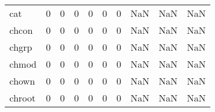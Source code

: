 \begin{longtable}{lrrrrrrrrr}
cat       &                                       0 &                                                  0 &                                                  0 &                                                  0 &                                                  0 &                                                  0 &                                                NaN &                                    NaN &                                  NaN \\
chcon     &                                       0 &                                                  0 &                                                  0 &                                                  0 &                                                  0 &                                                  0 &                                                NaN &                                    NaN &                                  NaN \\
chgrp     &                                       0 &                                                  0 &                                                  0 &                                                  0 &                                                  0 &                                                  0 &                                                NaN &                                    NaN &                                  NaN \\
chmod     &                                       0 &                                                  0 &                                                  0 &                                                  0 &                                                  0 &                                                  0 &                                                NaN &                                    NaN &                                  NaN \\
chown     &                                       0 &                                                  0 &                                                  0 &                                                  0 &                                                  0 &                                                  0 &                                                NaN &                                    NaN &                                  NaN \\
chroot    &                                       0 &                                                  0 &                                                  0 &                                                  0 &                                                  0 &                                                  0 &                                                NaN &                                    NaN &                                  NaN \\

\end{longtable}
